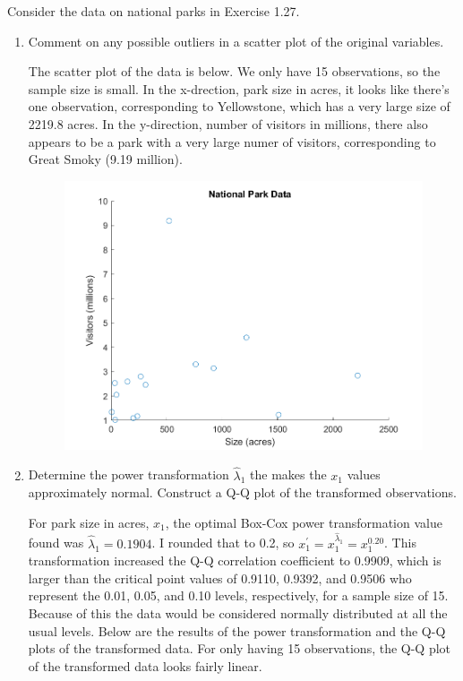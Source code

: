 Consider the data on national parks in Exercise 1.27.
\begin{enumerate}[label= (\alph*)]
    \item Comment on any possible outliers in a scatter plot of the original variables.
    
    The scatter plot of the data is below. We only have 15 observations, so the sample size is small. In the x-drection, park size in acres, it looks like there's one observation, corresponding to Yellowstone, which has a very large size of 2219.8 acres. In the y-direction, number of visitors in millions, there also appears to be a park with a very large numer of visitors, corresponding to Great Smoky (9.19 million).

    \begin{center}
        \begin{figure}[H]
            \centering
            \includegraphics[scale=0.6]{./matlab/chapter-4/sol4.40.a.png}
        \end{figure}
    \end{center}

    \item Determine the power transformation $\hat{\lambda}_{1}$ the makes the $x_{1}$ values approximately
    normal. Construct a Q-Q plot of the transformed observations.

    For park size in acres, $x_{1}$, the optimal Box-Cox power transformation value found was $\hat{\lambda}_{1} = 0.1904$.
    I rounded that to 0.2, so $x_{1}^{\prime} = x_{1}^{\hat{\lambda}_{1}} = x_{1}^{0.20}$. This transformation increased the Q-Q correlation coefficient to 0.9909, which is larger than the critical point values of 0.9110, 0.9392, and 0.9506 who represent the 0.01, 0.05, and 0.10 levels, respectively, for a sample size of 15.
    Because of this the data would be considered normally distributed at all the usual levels.
    Below are the results of the power transformation and the Q-Q plots of the transformed data.
    For only having 15 observations, the Q-Q plot of the transformed data looks fairly linear.


\end{enumerate}
